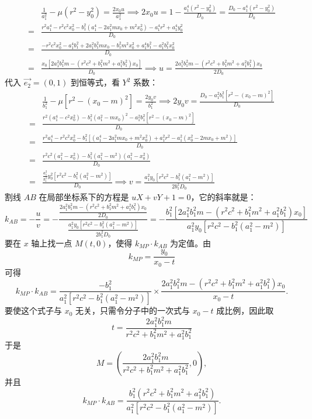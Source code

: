 \begin{solution}
\begin{align*}
&\frac{1}{a_1^2} - \mu(r^2 - y_0^2) = \frac{2x_0 u}{a_1^2} \implies 2x_0 u = 1 - \frac{a_1^4(r^2 - y_0^2)}{D_0} = \frac{D_0 - a_1^4(r^2 - y_0^2)}{D_0}\\
=&\frac{r^2 a_1^4 - r^2 c^2 x_0^2 - b_1^2(a_1^4 - 2a_1^2 m x_0 + m^2 x_0^2) - a_1^4 r^2 + a_1^4 y_0^2}{D_0}\\
=&\frac{-r^2 c^2 x_0^2 - a_1^4 b_1^2 + 2a_1^2 b_1^2 m x_0 - b_1^2 m^2 x_0^2 + a_1^4 b_1^2 - a_1^2 b_1^2 x_0^2}{D_0}\\
=& \frac{x_0 [2a_1^2 b_1^2 m - (r^2 c^2 + b_1^2 m^2 + a_1^2 b_1^2) x_0]}{D_0} \implies u = \frac{2a_1^2 b_1^2 m - (r^2 c^2 + b_1^2 m^2 + a_1^2 b_1^2) x_0}{2 D_0}
\end{align*}
代入 $\vec{e_2} = (0,1)$ 到恒等式，看 $Y^2$ 系数：
\begin{align*}
&\frac{1}{b_1^2} - \mu[r^2 - (x_0-m)^2] = \frac{2y_0 v}{b_1^2} \implies 2y_0 v = \frac{D_0 - a_1^2 b_1^2 [r^2 - (x_0-m)^2]}{D_0}\\
=&\frac{r^2(a_1^4 - c^2 x_0^2) - b_1^2(a_1^2 - m x_0)^2-a_1^2 b_1^2 [r^2 - (x_0-m)^2]}{D_0}\\
=&\frac{r^2a_1^4-r^2c^2x_0^2-b_1^2\left[(a_1^4-2a_1^2m x_0+m^2x_0^2)+a_1^2r^2-a_1^2(x_0^2-2mx_0+m^2)\right]}{D_0}\\
=&\frac{r^2 c^2(a_1^2 - x_0^2) - b_1^2(a_1^2 - m^2)(a_1^2 - x_0^2)}{D_0}\\
=&\frac{\frac{a_1^2}{b_1^2} y_0^2 [r^2 c^2 - b_1^2(a_1^2 - m^2)]}{D_0} \implies v = \frac{a_1^2 y_0 [r^2 c^2 - b_1^2(a_1^2 - m^2)]}{2b_1^2 D_0}
\end{align*}
割线 $AB$ 在局部坐标系下的方程是 $uX + vY + 1 = 0$，它的斜率就是：
$$k_{AB} = -\frac{u}{v} = - \frac{\frac{2a_1^2 b_1^2 m - (r^2 c^2 + b_1^2 m^2 + a_1^2 b_1^2) x_0}{2 D_0}}{\frac{a_1^2 y_0 [r^2 c^2 - b_1^2(a_1^2 - m^2)]}{2b_1^2 D_0}}= - \frac{b_1^2 [2a_1^2 b_1^2 m - (r^2 c^2 + b_1^2 m^2 + a_1^2 b_1^2) x_0]}{a_1^2 y_0 [r^2 c^2 - b_1^2(a_1^2 - m^2)]}$$
要在 $x$ 轴上找一点 $M(t, 0)$，使得 $k_{MP} \cdot k_{AB}$ 为定值。由
$$k_{MP} = \frac{y_0}{x_0 - t}$$
可得
$$k_{MP} \cdot k_{AB} = \frac{-b_1^2}{a_1^2 [r^2 c^2 - b_1^2(a_1^2 - m^2)]} \times \frac{2a_1^2 b_1^2 m - (r^2 c^2 + b_1^2 m^2 + a_1^2 b_1^2) x_0}{x_0 - t}.$$
要使这个式子与 $x_0$ 无关，只需令分子中的一次式与 $x_0-t$ 成比例，因此取
$$t = \frac{2a_1^2 b_1^2 m}{r^2 c^2 + b_1^2 m^2 + a_1^2 b_1^2}$$
于是
$$M=\left( \frac{2a_1^2 b_1^2 m}{r^2 c^2 + b_1^2 m^2 + a_1^2 b_1^2}, 0 \right),$$
并且
$$k_{MP} \cdot k_{AB} = {\frac{b_1^2 (r^2 c^2 + b_1^2 m^2 + a_1^2 b_1^2)}{a_1^2 [r^2 c^2 - b_1^2(a_1^2 - m^2)]}}.$$
\end{solution}

